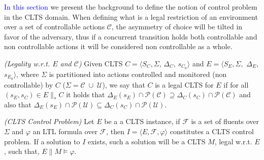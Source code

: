 \textcolor{blue}{In this section} we present the background to define the notion of control problem in the CLTS domain.  When defining what is a legal restriction of an environment over a set of controllable actions $\mathcal{C}$, the asymmetry of choice will be tilted in favor of the adversary, thus if a concurrent transition holds both controllable and non controllable actions it will be considered non controllable as a whole.

\begin{definition}
	\label{def:legal_clts} \emph{(Legality w.r.t. $E$ and $\mathcal{C}$)} 
	Given CLTS $C = \langle S_C, \Sigma$, $\Delta_C$, $s_{C_0}\rangle$ and $E = \langle S_E,\Sigma,$ $\Delta_E,$ $s_{E_0}\rangle$, where $\Sigma$ is partitioned into actions controlled and monitored (non controllable) by $C$ ($\Sigma=\mathcal{C} \; \cup \;\mathcal{U}$), we say that $C$ is a legal CLTS for $E$ if for all $(s_E,s_C) \in E \parallel_* C$ it holds that
	$\Delta_{E}(s_E)\cap \mathcal{P}(\mathcal{C}) \supseteq \Delta_{C}(s_C)\cap \mathcal{P}(\mathcal{C})$ and also that  $\Delta_{E}(s_E)\cap \mathcal{P}(\mathcal{U}) \subseteq \Delta_{C}(s_C)\cap \mathcal{P}(\mathcal{U})$.
\end{definition}

\begin{definition}
	\label{def:mixed_control_problem} \emph{(CLTS Control Problem)} 
	Let $E$ be a a CLTS instance, if $\mathcal{F}$ is a set of fluents over $\Sigma$ and $\varphi$ an LTL formula over $\mathcal{F}$, then $I = \langle E, \mathcal{F}, \varphi \rangle$ constitutes a CLTS control problem. If a solution to $I$ exists, such a solution will be a CLTS $M$, legal w.r.t. $E$, such that, $E \parallel M \models \varphi$.
\end{definition}
